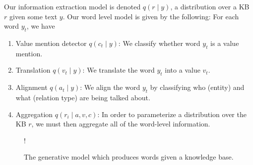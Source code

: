 \documentclass[12pt]{article}
\begin{document}
Our information extraction model is denoted $q(r \mid y)$,
a distribution over a KB $r$ given some text $y$.
Our word level model is given by the following:
For each word $y_t$, we have
\begin{enumerate}
\item Value mention detector $q(c_t \mid y)$: We classify whether word $y_t$
   is a value mention. 
\item Translation $q(v_t \mid y)$: We translate the word $y_t$ into a value $v_t$.
\item Alignment $q(a_t \mid y)$: We align the word $y_t$ by classifying who (entity) and what (relation type)
are being talked about.
\item Aggregation $q(r_i \mid a,v,c)$:
In order to parameterize a distribution over the KB $r$,
we must then aggregate all of the word-level information.

\end{enumerate}



\begin{figure}[t]
\begin{center}
\resizebox {.3\columnwidth} {!} {
} %
\end{center}
\caption{The generative model which produces words given a knowledge base.}
\label{fig:genmodel}
\end{figure}
\end{document}
